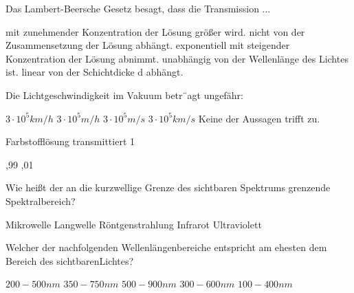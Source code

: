 \documentclass[11pt]{exam}
\begin{document}
\setlength{\voffset}{-0.5in}
\setlength{\headsep}{5pt}

\hspace{2mm}
 \hspace{5mm}
\vspace{4mm}

\begin{questions}

\question Das Lambert-Beersche Gesetz besagt, dass die Transmission ...

\begin{choices}
	\choice mit zunehmender Konzentration der Lösung größer wird.
	\choice nicht von der Zusammensetzung der Lösung abhängt.
	\choice exponentiell mit steigender Konzentration der Lösung abnimmt.
	\choice unabhängig von der Wellenlänge des Lichtes ist.
	\choice linear von der Schichtdicke d abhängt.
\end{choices}

\vspace{3mm}\question Die Lichtgeschwindigkeit im Vakuum betr¨agt ungefähr:

\begin{choices}
	\choice \( 3 \cdot10^5 km/h \)
	\choice \( 3 \cdot10^5 m/h \)
	\choice \( 3 \cdot10^5 m/s \)
	\choice \( 3 \cdot10^5 km/s \)
	\choice Keine der Aussagen trifft zu.
\end{choices}

\vspace{3mm}\question Farbstofflösung transmittiert 1 %

\begin{choices}
	,99
	,01
\end{choices}

\vspace{3mm}\question Wie heißt der an die kurzwellige Grenze des sichtbaren Spektrums grenzende Spektralbereich?

\begin{choices}
	\choice Mikrowelle
	\choice Langwelle
	\choice Röntgenstrahlung
	\choice Infrarot
	\choice Ultraviolett
\end{choices}

\vspace{3mm}\question Welcher der nachfolgenden Wellenlängenbereiche entspricht am ehesten dem Bereich des sichtbarenLichtes?

\begin{choices}
	\choice \( 200 - 500 nm \)
	\choice \( 350 - 750 nm \)
	\choice \( 500 - 900 nm \)
	\choice \( 300 - 600 nm \)
	\choice \( 100 - 400 nm \)
\end{choices}

\vspace{3mm}\end{questions}
\end{document}
